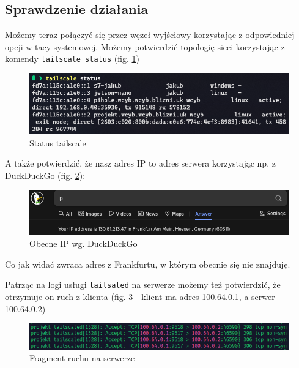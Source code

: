 \documentclass{report}
\numberwithin{equation}{section}
\begin{document}
\subsection{Sprawdzenie działania}
Możemy teraz połączyć się przez węzeł wyjściowy korzystając z odpowiedniej opcji w tacy systemowej. Możemy potwierdzić topologię sieci korzystając z komendy \texttt{tailscale status} (fig. \ref{fig:tailscale_status})
\begin{figure}[H]
    \centering
    \includegraphics[scale=1]{tailscale-status.png}
    \caption{Status tailscale}
    \label{fig:tailscale_status}
\end{figure}
\begin{samepage}
A także potwierdzić, że nasz adres IP to adres serwera korzystając np. z DuckDuckGo (fig. \ref{fig:ip_check}):
\begin{figure}[H]
    \centering
    \includegraphics[scale=0.5]{ddg-ip.png}
    \caption{Obecne IP wg. DuckDuckGo}
    \label{fig:ip_check}
\end{figure}
Co jak widać zwraca adres z Frankfurtu, w którym obecnie się nie znajduję.

Patrząc na logi usługi \texttt{tailsaled} na serwerze możemy też potwierdzić, że otrzymuje on ruch z klienta (fig. \ref{fig:tailscale-traffic} - klient ma adres 100.64.0.1, a serwer 100.64.0.2)
\begin{figure}[H]
    \centering
    \includegraphics[scale=1]{tailscale-traffic.png}
    \caption{Fragment ruchu na serwerze}
    \label{fig:tailscale-traffic}
\end{figure}
\end{samepage}
\end{document}

